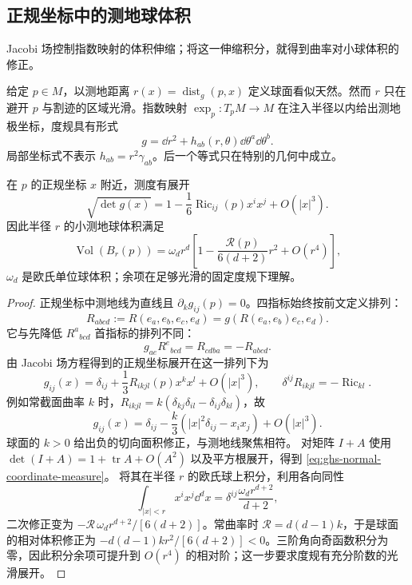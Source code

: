 \subsection{正规坐标中的测地球体积}

Jacobi 场控制指数映射的体积伸缩；将这一伸缩积分，就得到曲率对小球体积的修正。

给定 $p\in M$，以测地距离 $r(x)=\operatorname{dist}_g(p,x)$ 定义球面看似天然。然而 $r$ 只在避开 $p$ 与割迹的区域光滑。指数映射 $\exp_p:T_pM\to M$ 在注入半径以内给出测地极坐标，度规具有形式
\[
 g=\dd r^2+h_{ab}(r,\theta)\dd\theta^a\dd\theta^b.
\]
局部坐标式不表示 $h_{ab}=r^2\gamma_{ab}$。后一个等式只在特别的几何中成立。

\begin{theorem}[测地球的面积和曲率修正]
\label{thm:ghs-small-ball-volume}
在 $p$ 的正规坐标 $x$ 附近，测度有展开
\begin{equation}\label{eq:ghs-normal-coordinate-measure}
 \sqrt{\det g(x)}=1-\frac16\operatorname{Ric}_{ij}(p)x^ix^j+O(|x|^3).
\end{equation}
因此半径 $r$ 的小测地球体积满足
\begin{equation}\label{eq:ghs-small-geodesic-ball}
 \operatorname{Vol}(B_r(p))=\omega_d r^d
 \left[1-\frac{\mathcal R(p)}{6(d+2)}r^2+O(r^4)\right],
\end{equation}
$\omega_d$ 是欧氏单位球体积；余项在足够光滑的固定度规下理解。
\end{theorem}
\begin{proof}
正规坐标中测地线为直线且 $\partial_k g_{ij}(p)=0$。四指标始终按前文定义排列：
\[
 R_{abcd}:=R(e_a,e_b,e_c,e_d)=g(R(e_a,e_b)e_c,e_d).
\]
它与先降低 $R^a{}_{bcd}$ 首指标的排列不同：
\[
 g_{ae}R^e{}_{bcd}=R_{cdba}=-R_{abcd}.
\]
由 Jacobi 场方程得到的正规坐标展开在这一排列下为
\[
 g_{ij}(x)=\delta_{ij}+\frac13R_{ikjl}(p)x^kx^l+O(|x|^3),
 \qquad \delta^{ij}R_{ikjl}=-\operatorname{Ric}_{kl}.
\]
例如常截面曲率 $k$ 时，$R_{ikjl}=k(\delta_{kj}\delta_{il}-\delta_{ij}\delta_{kl})$，故
\[
 g_{ij}(x)=\delta_{ij}-\frac{k}{3}(|x|^2\delta_{ij}-x_ix_j)+O(|x|^3).
\]
球面的 $k>0$ 给出负的切向面积修正，与测地线聚焦相符。
对矩阵 $I+A$ 使用 $\det(I+A)=1+\operatorname{tr}A+O(A^2)$ 以及平方根展开，得到 \cref{eq:ghs-normal-coordinate-measure}。
将其在半径 $r$ 的欧氏球上积分，利用各向同性
\[
 \int_{|x|<r}x^ix^j\dd^d x
 =\delta^{ij}\frac{\omega_dr^{d+2}}{d+2},
\]
二次修正变为 $-\mathcal R\,\omega_d r^{d+2}/[6(d+2)]$。常曲率时 $\mathcal R=d(d-1)k$，于是球面的相对体积修正为 $-d(d-1)kr^2/[6(d+2)]<0$。三阶角向奇函数积分为零，因此积分余项可提升到 $O(r^4)$ 的相对阶；这一步要求度规有充分阶数的光滑展开。
\end{proof}
